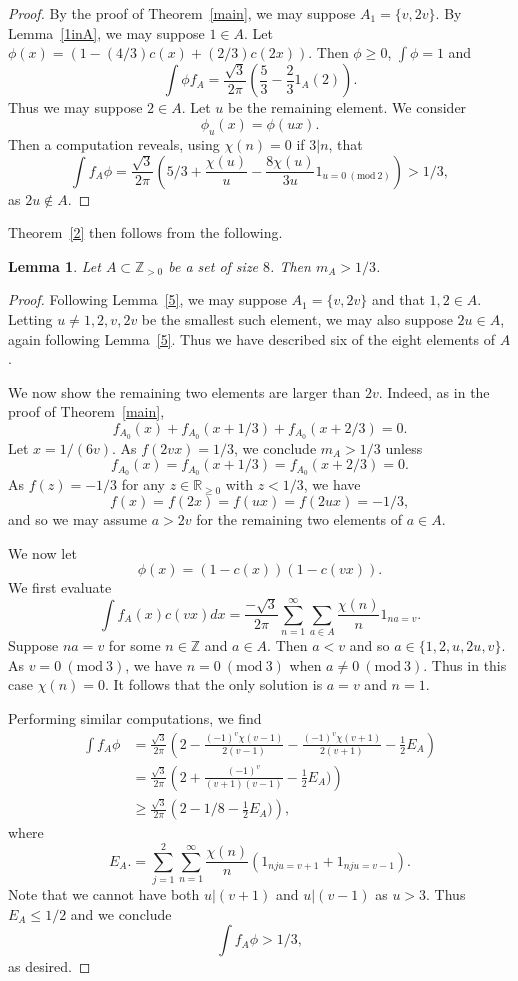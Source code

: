 \documentclass[12pt,reqno]{amsart}
\theoremstyle{dotless}
\newtheorem{lemma}{Lemma}
\newcommand{\Mod}[1]{\ (\mathrm{mod}\ #1)}
\begin{document}
\begin{proof} By the proof of Theorem~\ref{main}, we may suppose $A_1 = \{v ,2v\}$. By Lemma~\ref{1inA}, we may suppose $1 \in A$. Let $\phi(x) = (1 - (4/3) c(x) + (2/3) c(2x))$. Then $\phi \geq 0$, $\int \phi = 1$ and $$\int \phi f_A = \frac{\sqrt{3}}{2\pi}\left(\frac{5}{3}- \frac{2}{3} 1_A(2)\right).$$
Thus we may suppose $2 \in A$. Let $u$ be the remaining element. We consider 
$$\phi_u(x) = \phi(ux).$$
Then a computation reveals, using $\chi(n) = 0$ if $3| n$, that 
$$\int f_A \phi = \frac{\sqrt{3}}{2\pi} (5/3 + \frac{\chi(u)}{u} - \frac{8\chi(u)}{3u}1_{u = 0 \Mod 2}) > 1/3 ,$$
as $2u \notin A$.
\end{proof} 

Theorem~\ref{2} then follows from the following.

\begin{lemma}
Let $A \subset\mathbb{Z}_{>0}$ be a set of size $8$. Then $m_A > 1/3$.
\end{lemma}
\begin{proof}
Following Lemma~\ref{5}, we may suppose $A_1 = \{v , 2v\}$ and that $1,2 \in A$. Letting $u \neq 1,2,v,2v$ be the smallest such element, we may also suppose $2u \in A$, again following Lemma~\ref{5}. Thus we have described six of the eight elements of $A$.

We now show the remaining two elements are larger than $2v$. Indeed, as in the proof of Theorem~\ref{main}, 
$$f_{A_0}(x) + f_{A_0}(x+1/3) + f_{A_0}(x+2/3) =0 . $$
Let $x = 1/(6v)$. As $f(2vx) = 1/3$, we conclude $m_A > 1/3$ unless 
$$f_{A_0}(x) = f_{A_0}(x+1/3) =f_{A_0}(x+2/3) =0 . $$
As $f(z) = -1/3$ for any $z\in \mathbb{R}_{\geq 0 }$ with $z < 1/3$, we have 
$$f(x) = f(2x) = f(ux) =f(2ux) = -1/3,$$
and so we may assume $a > 2v$ for the remaining two elements of $a \in A$. 

 We now let
$$\phi(x) = (1- c(x)) (1- c(vx)).$$
We first evaluate $$\int f_A(x) c(vx)dx = \frac{- \sqrt{3}}{2\pi} \sum_{n=1}^{\infty} \sum_{a\in A} \frac{\chi(n)}{n}  1_{na = v}.$$ Suppose $na = v$ for some $n \in \mathbb{Z}$ and $a \in A$. Then $a < v$ and so $a \in\{ 1,2,u,2u,v\}$. As $v = 0 \Mod 3$, we have $n = 0 \Mod 3$ when $a \neq 0 \Mod 3$. Thus in this case $\chi(n) = 0$. It follows that the only solution is $a = v$ and $n=1$. 

Performing similar computations, we find 
\begin{align*}\int f_A \phi& = \frac{\sqrt{3}}{2\pi} \left(2 - \frac{(-1)^v\chi(v-1)}{2(v-1)} - \frac{(-1)^v\chi(v+1)}{2(v+1)}  - \frac{1}{2} E_A \right) \\
& =  \frac{\sqrt{3}}{2\pi} \left(2 + \frac{(-1)^{v}}{(v+1)(v-1)} -\frac{1}{2} E_A)\right)  \\
& \geq  \frac{\sqrt{3}}{2\pi} \left(2 - 1/8 -\frac{1}{2} E_A)\right),\end{align*}
where 
$$E_A. =\sum_{j=1}^2 \sum_{n=1}^{\infty} \frac{\chi(n)}{n} (1_{nju = v+1} +  1_{nju = v-1}).$$
Note that we cannot have both $u | (v+1)$ and $u | (v-1)$ as $u > 3$. Thus $E_A \leq 1/2$ and we conclude 
$$\int f_A \phi > 1/3,$$
as desired.


\end{proof}
\end{document}
